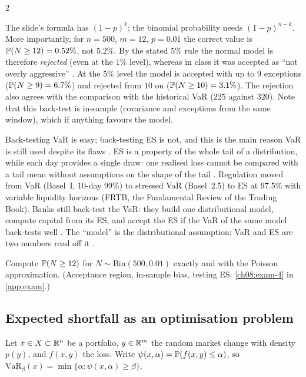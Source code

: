 \begin{paracol}{2}
\begin{coursenote}
The slide's formula has $(1-p)^k$; the binomial probability needs $(1-p)^{n-k}$. More importantly, for
$n=500$, $m=12$, $p=0.01$ the correct value is $\mathbb{P}(N\ge12)=0.52\%$, not $5.2\%$. By the stated $5\%$ rule the
normal model is therefore \emph{rejected} (even at the $1\%$ level), whereas in class it was accepted as ``not
overly aggressive'' . At the $5\%$ level the model is accepted with up to $9$ exceptions
($\mathbb{P}(N\ge9)=6.7\%$) and rejected from $10$ on ($\mathbb{P}(N\ge10)=3.1\%$). The rejection also agrees with the
comparison with the historical VaR ($225$ against $320$). Note that this back-test is in-sample (covariance and
exceptions from the same window), which if anything favours the model.
\end{coursenote}

Back-testing VaR is easy; back-testing ES is not, and this is the main reason VaR is still used despite its flaws
. ES is a property of the whole tail of a distribution, while each day provides a single draw: one
realised loss cannot be compared with a tail mean without assumptions on the shape of the tail
. Regulation moved from VaR (Basel~I, 10-day $99\%$) to stressed VaR (Basel~2.5) to ES at
$97.5\%$ with variable liquidity horizons (FRTB, the Fundamental Review of the Trading Book). Banks still
back-test the VaR: they build one distributional model, compute capital from its ES, and accept the ES if the VaR of
the same model back-tests well . The ``model'' is the distributional assumption; VaR and ES are
two numbers read off it .

\begin{exercise}\label{ch08:exam-4-short}
Compute $\mathbb{P}(N\ge12)$ for $N\sim\mathrm{Bin}(500,0.01)$ exactly and with the Poisson approximation. (Acceptance region, in-sample bias, testing ES: \cref{ch08:exam-4} in \cref{app:exam}.)
\end{exercise}

\subsection{Expected shortfall as an optimisation problem}
Let $x\in X\subset\mathbb{R}^n$ be a portfolio, $y\in\mathbb{R}^m$ the random market change with density $p(y)$, and $f(x,y)$ the
loss. Write $\psi(x,\alpha)=\mathbb{P}(f(x,y)\le\alpha)$, so $\mathrm{VaR}_\beta(x)=\min\{\alpha:\psi(x,\alpha)\ge\beta\}$.


\end{paracol}
